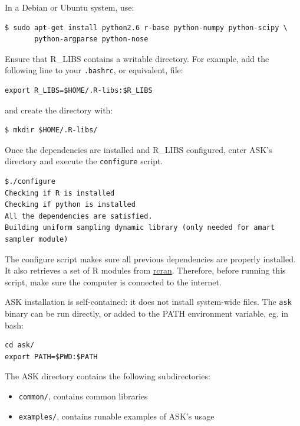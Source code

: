 In a Debian or Ubuntu system, use:

\begin{verbatim}
$ sudo apt-get install python2.6 r-base python-numpy python-scipy \
       python-argparse python-nose
\end{verbatim}

Ensure that R\_LIBS contains a writable directory. For example, add the following line to your \texttt{.bashrc}, or equivalent, file:
\begin{verbatim}
export R_LIBS=$HOME/.R-libs:$R_LIBS
\end{verbatim}

and create the directory with:
\begin{verbatim}
$ mkdir $HOME/.R-libs/
\end{verbatim}

Once the dependencies are installed and R\_LIBS configured, enter ASK's directory and execute the \texttt{configure} script.

\begin{verbatim}
$./configure
Checking if R is installed
Checking if python is installed
All the dependencies are satisfied.
Building uniform sampling dynamic library (only needed for amart sampler module)
\end{verbatim}

The configure script makes sure all previous dependencies are properly installed.
It also retrieves a set of R modules from \href{http://cran.r-project.org/}{rcran}.
Therefore, before running this script, make sure the computer is connected to the internet.

ASK installation is self-contained: it does not install system-wide files. The \texttt{ask} binary can be run directly, or added to 
the PATH environment variable, eg. in bash:
\begin{verbatim}
cd ask/
export PATH=$PWD:$PATH
\end{verbatim}

The ASK directory contains the following subdirectories:

\begin{itemize}
	\item \texttt{common/}, contains common libraries
\end{itemize}

\begin{itemize}
	\item \texttt{examples/}, contains runable examples of ASK's usage
\end{itemize}

